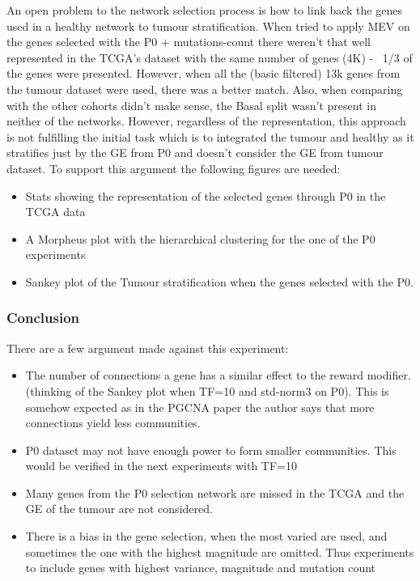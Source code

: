 An open problem to the network selection process is how to link back the genes used in a healthy network to tumour stratification. When tried to apply MEV on the genes selected with the P0 + mutations-count there weren't that well represented in the TCGA's dataset with the same number of genes (4K) - ~1/3 of the genes were presented. However, when all the (basic filtered) 13k genes from the tumour dataset were used, there was a better match. Also, when comparing with the other cohorts didn't make sense, the Basal split wasn't present in neither of the networks. However, regardless of the representation, this approach is not fulfilling the initial task which is to integrated the tumour and healthy as it stratifies just by the GE from P0 and doesn't consider the GE from tumour dataset.
To support this argument the following figures are needed:
\begin{itemize}
    \item Stats showing the representation of the selected genes through P0 in the TCGA data
    \item A Morpheus plot with the hierarchical clustering for the one of the P0 experiments
    \item Sankey plot of the Tumour stratification when the genes selected with the P0.
\end{itemize}


\subsubsection{Conclusion}

There are a few argument made against this experiment:
\begin{itemize}
    \item The number of connections a gene has a similar effect to the reward modifier. (thinking of the Sankey plot when TF=10 and std-norm3 on P0). This is somehow expected as in the PGCNA paper the author says that more connections yield less communities.
    \item P0 dataset may not have enough power to form smaller communities. This would be verified in the next experiments with TF=10
    \item Many genes from the P0 selection network are missed in the TCGA and the GE of the tumour are not considered.
    \item There is a bias in the gene selection, when the most varied are used, and sometimes the one with the highest magnitude are omitted. Thus experiments to include genes with highest variance, magnitude and mutation count
\end{itemize}



